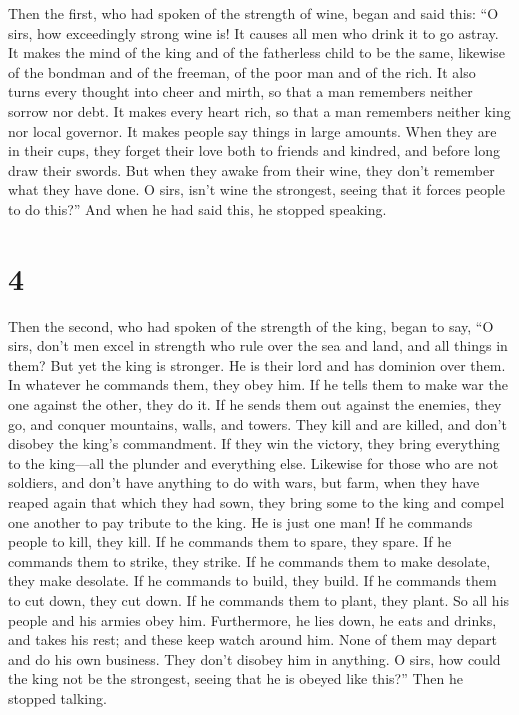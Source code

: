 Then the first, who had spoken of the strength of wine, began
 and said this: ``O sirs, how exceedingly strong wine is!
It causes all men who drink it to go astray.  It makes the
mind of the king and of the fatherless child to be the same, likewise of
the bondman and of the freeman, of the poor man and of the rich.
 It also turns every thought into cheer and mirth, so that
a man remembers neither sorrow nor debt.  It makes every
heart rich, so that a man remembers neither king nor local governor. It
makes people say things in large amounts.  When they are in
their cups, they forget their love both to friends and kindred, and
before long draw their swords.  But when they awake from
their wine, they don't remember what they have done.  O
sirs, isn't wine the strongest, seeing that it forces people to do
this?'' And when he had said this, he stopped speaking.

\hypertarget{section-3}{%
\section{4}\label{section-3}}

 Then the second, who had spoken of the strength of the
king, began to say,  ``O sirs, don't men excel in strength
who rule over the sea and land, and all things in them?  But
yet the king is stronger. He is their lord and has dominion over them.
In whatever he commands them, they obey him.  If he tells
them to make war the one against the other, they do it. If he sends them
out against the enemies, they go, and conquer mountains, walls, and
towers.  They kill and are killed, and don't disobey the
king's commandment. If they win the victory, they bring everything to
the king---all the plunder and everything else.  Likewise
for those who are not soldiers, and don't have anything to do with wars,
but farm, when they have reaped again that which they had sown, they
bring some to the king and compel one another to pay tribute to the
king.  He is just one man! If he commands people to kill,
they kill. If he commands them to spare, they spare.  If he
commands them to strike, they strike. If he commands them to make
desolate, they make desolate. If he commands to build, they build.
 If he commands them to cut down, they cut down. If he
commands them to plant, they plant.  So all his people and
his armies obey him. Furthermore, he lies down, he eats and drinks, and
takes his rest;  and these keep watch around him. None of
them may depart and do his own business. They don't disobey him in
anything.  O sirs, how could the king not be the strongest,
seeing that he is obeyed like this?'' Then he stopped talking.

